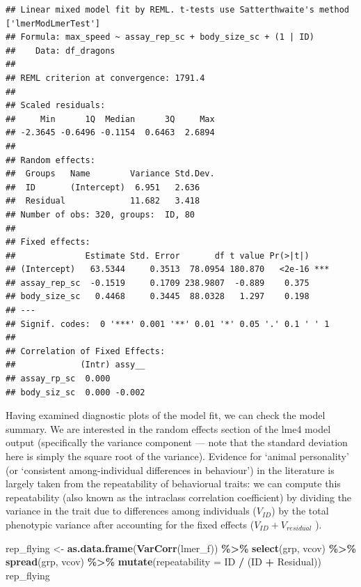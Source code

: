 \documentclass[
  12pt,
]{book}
\newenvironment{Shaded}{\begin{snugshade}}{\end{snugshade}}
\newcommand{\DataTypeTok}[1]{\textcolor[rgb]{0.13,0.29,0.53}{#1}}
\newcommand{\KeywordTok}[1]{\textcolor[rgb]{0.13,0.29,0.53}{\textbf{#1}}}
\newcommand{\NormalTok}[1]{#1}
\newcommand{\OperatorTok}[1]{\textcolor[rgb]{0.81,0.36,0.00}{\textbf{#1}}}
\newcommand{\StringTok}[1]{\textcolor[rgb]{0.31,0.60,0.02}{#1}}
\begin{document}
\begin{verbatim}
## Linear mixed model fit by REML. t-tests use Satterthwaite's method ['lmerModLmerTest']
## Formula: max_speed ~ assay_rep_sc + body_size_sc + (1 | ID)
##    Data: df_dragons
## 
## REML criterion at convergence: 1791.4
## 
## Scaled residuals: 
##     Min      1Q  Median      3Q     Max 
## -2.3645 -0.6496 -0.1154  0.6463  2.6894 
## 
## Random effects:
##  Groups   Name        Variance Std.Dev.
##  ID       (Intercept)  6.951   2.636   
##  Residual             11.682   3.418   
## Number of obs: 320, groups:  ID, 80
## 
## Fixed effects:
##              Estimate Std. Error       df t value Pr(>|t|)    
## (Intercept)   63.5344     0.3513  78.0954 180.870   <2e-16 ***
## assay_rep_sc  -0.1519     0.1709 238.9807  -0.889    0.375    
## body_size_sc   0.4468     0.3445  88.0328   1.297    0.198    
## ---
## Signif. codes:  0 '***' 0.001 '**' 0.01 '*' 0.05 '.' 0.1 ' ' 1
## 
## Correlation of Fixed Effects:
##             (Intr) assy__
## assay_rp_sc  0.000       
## body_siz_sc  0.000 -0.002
\end{verbatim}

Having examined diagnostic plots of the model fit, we can check the model summary. We are interested in the random effects section of the lme4 model output (specifically the variance component --- note that the standard deviation here is simply the square root of the variance). Evidence for `animal personality' (or `consistent among-individual differences in behaviour') in the literature is largely taken from the repeatability of behaviorual traits: we can compute this repeatability (also known as the intraclass correlation coefficient) by dividing the variance in the trait due to differences among individuals (\(V_{ID}\)) by the total phenotypic variance after accounting for the fixed effects (\(V_{ID} + V_{residual}\) ).

\begin{Shaded}
\begin{Highlighting}[]
\NormalTok{rep\_flying \textless{}{-}}\StringTok{ }\KeywordTok{as.data.frame}\NormalTok{(}\KeywordTok{VarCorr}\NormalTok{(lmer\_f)) }\OperatorTok{\%\textgreater{}\%}
\StringTok{  }\KeywordTok{select}\NormalTok{(grp, vcov) }\OperatorTok{\%\textgreater{}\%}
\StringTok{  }\KeywordTok{spread}\NormalTok{(grp, vcov) }\OperatorTok{\%\textgreater{}\%}
\StringTok{  }\KeywordTok{mutate}\NormalTok{(}\DataTypeTok{repeatability =}\NormalTok{ ID }\OperatorTok{/}\StringTok{ }\NormalTok{(ID }\OperatorTok{+}\StringTok{ }\NormalTok{Residual))}
\NormalTok{rep\_flying}
\end{Highlighting}
\end{Shaded}
\end{document}

